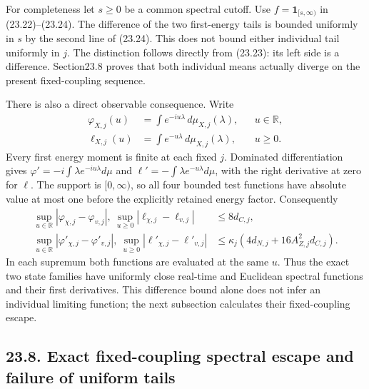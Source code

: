 \documentclass[
]{article}
\begin{document}
For completeness let \(s\ge0\) be a common spectral cutoff. Use
\(f=\mathbf1_{[s,\infty)}\) in (23.22)--(23.24). The difference of the
two first-energy tails is bounded uniformly in \(s\) by the second line
of (23.24). This does not bound either individual tail uniformly in
\(j\). The distinction follows directly from (23.23): its left side is a
difference. Section23.8 proves that both individual means actually
diverge on the present fixed-coupling sequence.

There is also a direct observable consequence. Write \[
\begin{aligned}
\varphi_{X,j}(u)&=\int e^{-iu\lambda}\,d\mu_{X,j}(\lambda),
                  &&u\in\mathbb R,\\
\ell_{X,j}(u)&=\int e^{-u\lambda}\,d\mu_{X,j}(\lambda),
                  &&u\ge0 .
\end{aligned}
\] Every first energy moment is finite at each fixed \(j\). Dominated
differentiation gives \(\varphi'=-i\int\lambda e^{-iu\lambda}d\mu\) and
\(\ell'=-\int\lambda e^{-u\lambda}d\mu\), with the right derivative at
zero for \(\ell\). The support is \([0,\infty)\), so all four bounded
test functions have absolute value at most one before the explicitly
retained energy factor. Consequently \[
\begin{aligned}
\sup_{u\in\mathbb R}|\varphi_{\chi,j}-\varphi_{v,j}|,\
\sup_{u\ge0}|\ell_{\chi,j}-\ell_{v,j}|
 &\le8d_{C,j},\\
\sup_{u\in\mathbb R}|\varphi'_{\chi,j}-\varphi'_{v,j}|,\
\sup_{u\ge0}|\ell'_{\chi,j}-\ell'_{v,j}|
 &\le\kappa_j(4d_{N,j}+16A_{Z,j}^2d_{C,j}).
\end{aligned}\tag{23.25}
\] In each supremum both functions are evaluated at the same \(u\). Thus
the exact two state families have uniformly close real-time and
Euclidean spectral functions and their first derivatives. This
difference bound alone does not infer an individual limiting function;
the next subsection calculates their fixed-coupling escape.

\subsection{23.8. Exact fixed-coupling spectral escape and failure of
uniform
tails}\label{exact-fixed-coupling-spectral-escape-and-failure-of-uniform-tails}
\end{document}
